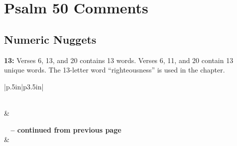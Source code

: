 \section{Psalm 50 Comments}

\subsection{Numeric Nuggets}
\textbf{13:} Verses 6, 13, and 20 contains 13 words. Verses 6, 11, and 20 contain 13 unique words. The 13-letter word ``righteousness'' is used in the chapter.

\newpage

\begin{mdframed}[style=MyFrame]
\begin{center}
\begin{longtable}{|p{.5in}|p{3.5in}|}

\caption[Corruption Alert: Psalm 50:23]{Corruption Alert: Psalm 50:23} \label{table:CorruptionProv18:1} \\ 

\hline  
{} & 
  \\ \hline 
\endfirsthead
 
{{\bfseries \tablename\ \thetable{} -- continued from previous page}} \\  \hline  
{} & 
  \\ \hline 
\endhead
 

\end{longtable}
\end{center}
\end{mdframed}
